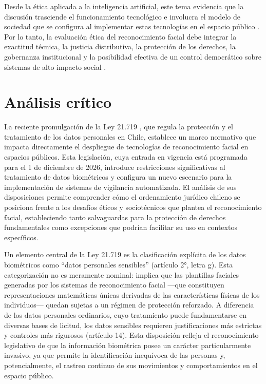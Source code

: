 \documentclass[11pt, a4paper]{article}
\begin{document}
Desde la ética aplicada a la inteligencia artificial, este tema evidencia que la discusión trasciende el funcionamiento tecnológico e involucra el modelo de sociedad que se configura al implementar estas tecnologías en el espacio público \citep{arriagada_nd}. Por lo tanto, la evaluación ética del reconocimiento facial debe integrar la exactitud técnica, la justicia distributiva, la protección de los derechos, la gobernanza institucional y la posibilidad efectiva de un control democrático sobre sistemas de alto impacto social \citep{perez_nd}.


\section{Análisis crítico}

La reciente promulgación de la Ley 21.719 \citep{ley21719}, que regula la protección y el tratamiento de los datos personales en Chile, establece un marco normativo que impacta directamente el despliegue de tecnologías de reconocimiento facial en espacios públicos. Esta legislación, cuya entrada en vigencia está programada para el 1 de diciembre de 2026, introduce restricciones significativas al tratamiento de datos biométricos y configura un nuevo escenario para la implementación de sistemas de vigilancia automatizada. El análisis de sus disposiciones permite comprender cómo el ordenamiento jurídico chileno se posiciona frente a los desafíos éticos y sociotécnicos que plantea el reconocimiento facial, estableciendo tanto salvaguardas para la protección de derechos fundamentales como excepciones que podrían facilitar su uso en contextos específicos.

Un elemento central de la Ley 21.719 es la clasificación explícita de los datos biométricos como ``datos personales sensibles'' (artículo 2°, letra g). Esta categorización no es meramente nominal: implica que las plantillas faciales generadas por los sistemas de reconocimiento facial ---que constituyen representaciones matemáticas únicas derivadas de las características físicas de los individuos--- quedan sujetas a un régimen de protección reforzado. A diferencia de los datos personales ordinarios, cuyo tratamiento puede fundamentarse en diversas bases de licitud, los datos sensibles requieren justificaciones más estrictas y controles más rigurosos (artículo 14). Esta disposición refleja el reconocimiento legislativo de que la información biométrica posee un carácter particularmente invasivo, ya que permite la identificación inequívoca de las personas y, potencialmente, el rastreo continuo de sus movimientos y comportamientos en el espacio público.
\end{document}
